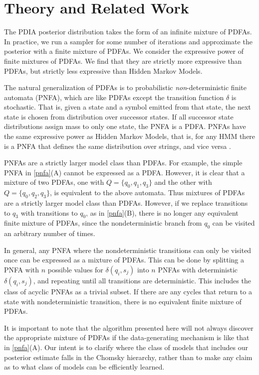 \section{Theory and Related Work}
\label{sec:theory}

The PDIA posterior distribution takes the form of an infinite mixture of PDFAs.  In practice, we run a sampler for some number of iterations and approximate the posterior with a finite mixture of PDFAs.  We consider the expressive power of finite mixtures of PDFAs.  We find that they are strictly more expressive than PDFAs, but strictly less expressive than Hidden Markov Models.

The natural generalization of PDFAs is to probabilistic {\em non}-deterministic finite automata (PNFA), which are like PDFAs except the transition function $\delta$ is stochastic.  That is, given a state and a symbol emitted from that state, the next state is chosen from distribution over successor states.  If all successor state distributions assign mass to only one state, the PNFA is a PDFA.  PNFAs have the same expressive power as Hidden Markov Models, that is, for any HMM there is a PNFA that defines the same distribution over strings, and vice versa \cite{Dupont2005}.

PNFAs are a strictly larger model class than PDFAs.  For example, the simple PNFA in \ref{pnfa}(A) cannot be expressed as a PDFA.  However, it is clear that a mixture of two PDFAs, one with $Q = \{q_0,q_1,q_3\}$ and the other with $Q = \{q_0,q_2,q_3\}$, is equivalent to the above automata.  Thus mixtures of PDFAs are a strictly larger model class than PDFAs.  However, if we replace transitions to $q_3$ with transitions to $q_0$, as in \ref{pnfa}(B), there is no longer any equivalent finite mixture of PDFAs, since the nondeterministic branch from $q_0$ can be visited an arbitrary number of times.  

In general, any PNFA where the nondeterministic transitions can only be visited once can be expressed as a mixture of PDFAs.  This can be done by splitting a PNFA with $n$ possible values for $\delta(q_i,s_j)$ into $n$ PNFAs with deterministic $\delta(q_i,s_j)$, and repeating until all transitions are deterministic.  This includes the class of acyclic PNFAs as a trivial subset.  If there are any cycles that return to a state with nondeterministic transition, there is no equivalent finite mixture of PDFAs.

It is important to note that the algorithm presented here will not always discover the appropriate mixture of PDFAs if the data-generating mechanism is like that in \ref{pnfa}(A).  Our intent is to clarify where the class of models that includes our posterior estimate falls in the Chomsky hierarchy, rather than to make any claim as to what class of models can be efficiently learned.


